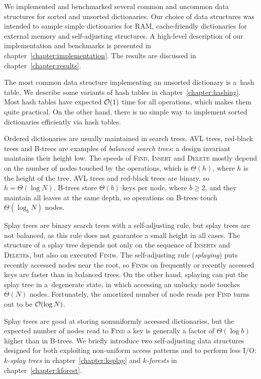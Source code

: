 We implemented and benchmarked several common and uncommon data structures
for sorted and unsorted dictionaries. Our choice of data structures was
intended to sample simple dictionaries for RAM, cache-friendly dictionaries
for external memory and self-adjusting structures.
A high-level description of our implementation and benchmarks is presented
in chapter~\ref{chapter:implementation}. The results are discussed in
chapter~\ref{chapter:results}.

The most common data structure implementing an unsorted dictionary is a~hash
table. We describe some variants of hash tables in chapter~\ref{chapter:hashing}.
Most hash tables have expected $\mathcal{O}(1)$ time for all operations, which
makes them quite practical. On the other hand, there is no simple way to
implement sorted dictionaries efficiently via hash tables.

Ordered dictionaries are usually maintained in search trees.
AVL trees, red-black trees and B-trees are examples of \emph{balanced search
trees}: a design invariant maintains their height low. The speeds
of \textsc{Find}, \textsc{Insert} and \textsc{Delete} mostly depend
on the number of nodes touched by the operations, which is $\Theta(h)$, where
$h$ is the height of the tree. AVL trees and red-black trees are binary, so
$h=\Theta(\log N)$. B-trees store $\Theta(b)$ keys per node, where $b\geq 2$,
and they maintain all leaves at the same depth, so operations on B-trees
touch $\Theta(\log_b N)$ nodes.

Splay trees are binary search trees with a self-adjusting rule, but splay
trees are not balanced, as this rule does not guarantee a small height in all
cases. The structure of a splay tree depends not only on the sequence of
\textsc{Insert}s and \textsc{Delete}s, but also on executed \textsc{Find}s.
The self-adjusting rule (\emph{splaying}) puts recently accessed nodes
near the root, so \textsc{Find}s on frequently or recently accessed keys
are faster than in balanced trees. On the other hand, splaying can put
the splay tree in a~degenerate state, in which accessing an unlucky node
touches $\Theta(N)$ nodes. Fortunately, the amortized number of node
reads per \textsc{Find} turns out to be $\mathcal{O}(\log N)$.

Splay trees are good at storing nonuniformly accessed dictionaries, but
the expected number of nodes read to \textsc{Find} a key is generally a factor
of $\Theta(\log b)$ higher than in B-trees. We briefly introduce two
self-adjusting data structures designed for both exploiting non-uniform
access patterns and to perform less I/O: \emph{$k$-splay trees} in
chapter~\ref{chapter:ksplay} and \emph{$k$-forests} in
chapter~\ref{chapter:kforest}.

